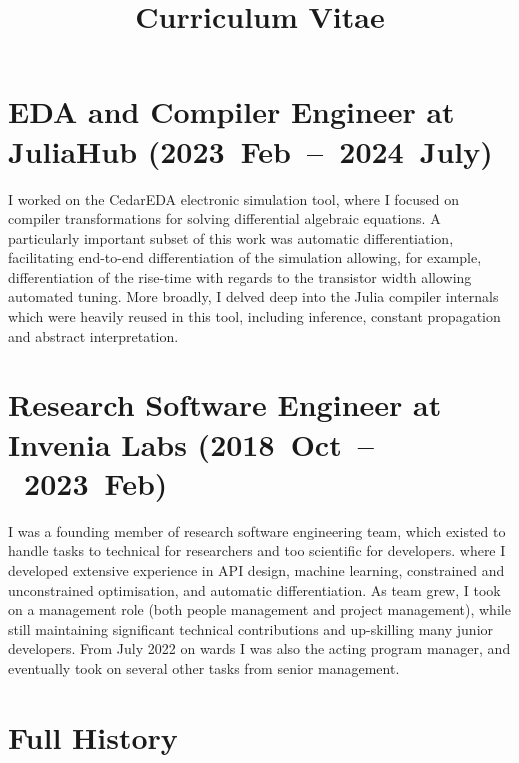 \documentclass[11pt,a4paper,sans]{moderncv}
\title{Curriculum Vitae}
\begin{document}
\makecvtitle

\section{EDA and Compiler Engineer at JuliaHub (2023~Feb~--~2024~July)}
I worked on the CedarEDA electronic simulation tool, where I focused on compiler transformations for solving differential algebraic equations.
A particularly important subset of this work was automatic differentiation, facilitating end-to-end differentiation of the simulation allowing, for example, differentiation of the rise-time with regards to the transistor width allowing automated tuning.
More broadly, I delved deep into the Julia compiler internals which were heavily reused in this tool, including inference, constant propagation and abstract interpretation.


\section {Research Software Engineer at Invenia Labs (2018~Oct~--~2023~Feb)}
I was a founding member of research software engineering team, which existed to handle tasks to technical for researchers and too scientific for developers.
where I developed extensive experience in API design, machine learning, constrained and unconstrained optimisation, and automatic differentiation.
As team grew, I took on a management role (both people management and project management), while still maintaining significant technical contributions and up-skilling many junior developers.
From July 2022 on wards I was also the acting program manager, and eventually took on several other tasks from senior management.


\section{Full History}
\end{document}
